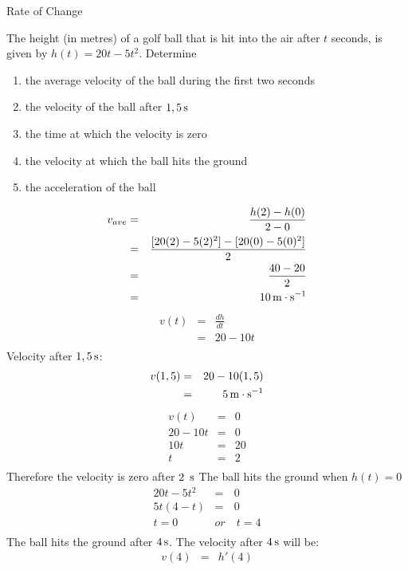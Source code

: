 \begin{wex}{Rate of Change}{The height (in metres) of a golf ball that is hit into the air after $t$ seconds, is given by $h(t)= 20t-5t^2$.  Determine
\begin{enumerate}
\item{the average velocity of the ball during the first two seconds}
\item{the velocity of the ball after $1,5\,\mathrm{s}$}
\item{the time at which the velocity is zero}
\item{the velocity at which the ball hits the ground}
\item{the acceleration of the ball}
\end{enumerate}
}{
\begin{eqnarray*}
v_{ave}&=& \frac{h(2)-h(0)}{2-0}\\
&=& \frac{[20(2)-5(2)^2]-[20(0)- 5(0)^2]}{2}\\
&=& \frac{40-20}{2}\\
&=& 10 \,\mathrm{m \cdot s^{-1}}\\
\end{eqnarray*}
\begin{eqnarray*}
v(t)&=&\frac{dh}{dt}\\
&=& 20 - 10t\\
\end{eqnarray*}
Velocity after $1,5\,\mathrm{s}$:
\begin{eqnarray*}
v(1,5)&=& 20 - 10(1,5)\\
&=& 5 \,\mathrm{m \cdot s^{-1}}\\
\end{eqnarray*}
\begin{eqnarray*}
v(t) &=& 0\\
20 - 10t &=& 0\\
10t &=& 20\\
t &=& 2\\
\end{eqnarray*}
Therefore the velocity is zero after $2~\,\mathrm{s}$
The ball hits the ground when $h(t) = 0$
\begin{eqnarray*}
20t - 5t^2 &=& 0\\
5t(4-t) &=& 0\\
t = 0 ~ &or& ~ t = 4\\
\end{eqnarray*}
The ball hits the ground after $4\,\mathrm{s}$.  The velocity after $4\,\mathrm{s}$ will be:
\begin{eqnarray*}
v(4) &=& h'(4)\\

\end{eqnarray*}}
\end{wex}
